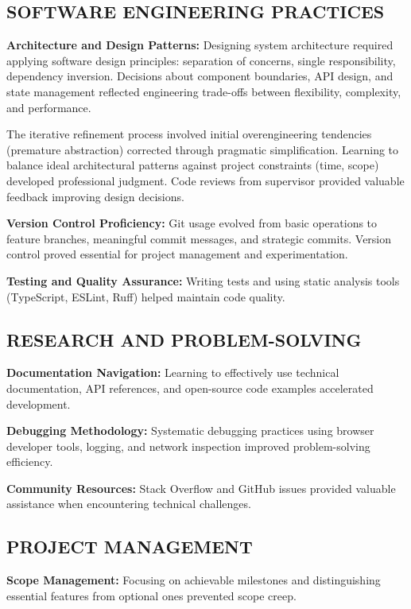 \documentclass[12pt]{article}
\begin{document}
\subsection{SOFTWARE ENGINEERING PRACTICES}

\textbf{Architecture and Design Patterns:} Designing system architecture required applying software design principles: separation of concerns, single responsibility, dependency inversion. Decisions about component boundaries, API design, and state management reflected engineering trade-offs between flexibility, complexity, and performance.

The iterative refinement process involved initial overengineering tendencies (premature abstraction) corrected through pragmatic simplification. Learning to balance ideal architectural patterns against project constraints (time, scope) developed professional judgment. Code reviews from supervisor provided valuable feedback improving design decisions.

\textbf{Version Control Proficiency:} Git usage evolved from basic operations to feature branches, meaningful commit messages, and strategic commits. Version control proved essential for project management and experimentation.

\textbf{Testing and Quality Assurance:} Writing tests and using static analysis tools (TypeScript, ESLint, Ruff) helped maintain code quality.

\subsection{RESEARCH AND PROBLEM-SOLVING}

\textbf{Documentation Navigation:} Learning to effectively use technical documentation, API references, and open-source code examples accelerated development.

\textbf{Debugging Methodology:} Systematic debugging practices using browser developer tools, logging, and network inspection improved problem-solving efficiency.

\textbf{Community Resources:} Stack Overflow and GitHub issues provided valuable assistance when encountering technical challenges.

\subsection{PROJECT MANAGEMENT}

\textbf{Scope Management:} Focusing on achievable milestones and distinguishing essential features from optional ones prevented scope creep.
\end{document}

